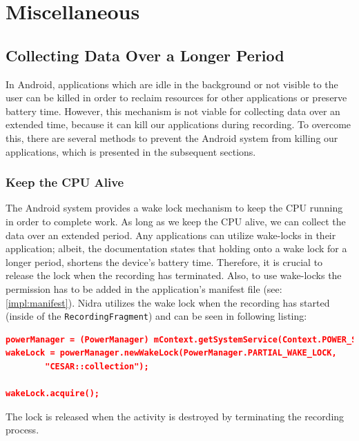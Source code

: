

\section{Miscellaneous}

\subsection{Collecting Data Over a Longer Period}
In Android, applications which are idle in the background or not visible to the user can be killed in order to reclaim resources for other applications or preserve battery time. However, this mechanism is not viable for collecting data over an extended time, because it can kill our applications during recording. To overcome this, there are several methods to prevent the Android system from killing our applications, which is presented in the subsequent sections.

\subsubsection{Keep the CPU Alive}
The Android system provides a wake lock mechanism to keep the CPU running in order to complete work. As long as we keep the CPU alive, we can collect the data over an extended period. Any applications can utilize wake-locks in their application; albeit, the documentation states that holding onto a wake lock for a longer period, shortens the device's battery time. Therefore, it is crucial to release the lock when the recording has terminated. Also, to use wake-locks the permission has to be added in the application's manifest file (see: \ref{impl:manifest}). Nidra utilizes the wake lock when the recording has started (inside of the \verb|RecordingFragment|) and can be seen in following listing:

\begin{lstlisting}[language=json, caption={}, captionpos=b]
powerManager = (PowerManager) mContext.getSystemService(Context.POWER_SERVICE);
wakeLock = powerManager.newWakeLock(PowerManager.PARTIAL_WAKE_LOCK,
        "CESAR::collection");

wakeLock.acquire();
\end{lstlisting}
The lock is released when the activity is destroyed by terminating the recording process.


